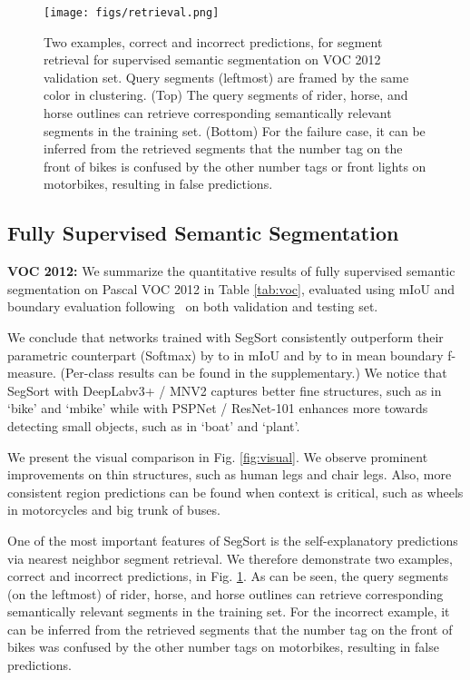 \documentclass[10pt,twocolumn,letterpaper]{article}
\begin{document}
\begin{figure}
    \centering
    \texttt{[image: figs/retrieval.png]}
    \caption{Two examples, correct and incorrect predictions, for segment retrieval for supervised semantic segmentation on VOC 2012 validation set. Query segments (leftmost) are framed by the same color in clustering. (Top) The query segments of rider, horse, and horse outlines can retrieve corresponding semantically relevant segments in the training set. (Bottom) For the failure case, it can be inferred from the retrieved segments that the number tag on the front of bikes is confused by the other number tags or front lights on motorbikes, resulting in false predictions.}
    \label{fig:retrieval}
\end{figure}




\subsection{Fully Supervised Semantic Segmentation}
\label{sec:exp_fully}


\noindent \textbf{VOC 2012:} We summarize the quantitative results of fully supervised semantic segmentation on Pascal VOC 2012 \cite{pascal-voc-2012} in Table \ref{tab:voc}, evaluated using mIoU and boundary evaluation following~\cite{arbelaez2011contour,aaf2018} on both validation and testing set.

We conclude that networks trained with SegSort consistently outperform their parametric counterpart (Softmax) by  to  in mIoU and by  to  in mean boundary f-measure. (Per-class results can be found in the supplementary.) We notice that SegSort with DeepLabv3+ / MNV2 captures better fine structures, such as in `bike' and `mbike' while with PSPNet / ResNet-101 enhances more towards detecting small objects, such as in `boat' and `plant'.

We present the visual comparison in Fig. \ref{fig:visual}. We observe prominent improvements on thin structures, such as human legs and chair legs. Also, more consistent region predictions can be found when context is critical, such as wheels in motorcycles and big trunk of buses.

One of the most important features of SegSort is the self-explanatory predictions via nearest neighbor segment retrieval. We therefore demonstrate two examples, correct and incorrect predictions, in Fig. \ref{fig:retrieval}. As can be seen, the query segments (on the leftmost) of rider, horse, and horse outlines can retrieve corresponding semantically relevant segments in the training set. For the incorrect example, it can be inferred from the retrieved segments that the number tag on the front of bikes was confused by the other number tags on motorbikes, resulting in false predictions. \\
\end{document}
